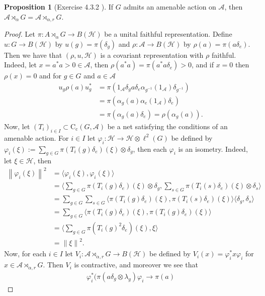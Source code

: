\documentclass[10pt,oneside,openany,final]{memoir}
\theoremstyle{definition}
\newtheorem{proposition}[theorem]{Proposition}
\theoremstyle{Break}
\newcommand{\lv}{\left\lVert}
\newcommand{\rv}{\right\rVert}
\newcommand{\A}{\mathcal{A}}
\newcommand{\cc}{\text{C}_{\text{c}}}
\renewcommand{\H}{\mathcal{H}}
\begin{document}
\begin{proposition}[Exercise 4.3.2 \text{[BO]}]
If $G$ admits an amenable action on $\A$, then $\A \rtimes_{\alpha}G=\A \rtimes_{\alpha,r}G$.
\begin{proof}
Let $\pi \colon A \rtimes_{\alpha} G \to B(\H)$ be a unital faithful representation. Define $u\colon G \to B(\H)$ by $u(g)=\pi(\delta_{g})$ and $\rho \colon \A \to B(\H)$ by $\rho(a)=\pi(a \delta_{e})$. Then we have that $(\rho,u,\H)$ is a covariant representation with $\rho$ faithful. Indeed, let $x=a^*a>0 \in \A$, then $\rho(a^*a)=\pi(a^*a \delta_{e})>0$, and if $x=0$ then $\rho(x)=0$ and for $g \in G$ and $a \in \A$ 
\begin{align*}
u_{g} \rho(a) u_{g}^*&=\pi(1_{\A} \delta_{g} a \delta_{e} \alpha_{g^{-1}}(1_{\A})\delta_{g^{-1}})\\
&= \pi(\alpha_{g}(a) \alpha_{e}(1_{\A}) \delta_{e})\\
&=\pi(\alpha_{g}(a) \delta_{e})=\rho(\alpha_{g}(a)). 
\end{align*}
Now, let $(T_{i})_{i \in I} \subset \cc(G,\A)$ be a net satisfying the conditions of an amenable action. For $i \in I$ let $\varphi_{i} \colon \H \to \H \otimes \ell^2(G)$ be defined by $\varphi_{i}(\xi):=\sum_{g \in G} \pi(T_{i}(g)\delta_{e})(\xi) \otimes \delta_{g}$, then each $\varphi_{i}$ is an isometry. Indeed, let $\xi \in \H$, then 
\begin{align*}
\lv \varphi_{i}(\xi)\rv^2&= \langle \varphi_{i}(\xi), \varphi_{i}(\xi)\rangle\\
&=\langle \sum_{g \in G} \pi(T_{i}(g)\delta_{e})(\xi) \otimes \delta_{g}, \sum_{s \in G} \pi(T_{i}(s)\delta_{e})(\xi) \otimes \delta_{s} \rangle\\
&=\sum_{g \in G} \sum_{s \in G} \langle \pi(T_{i}(g)\delta_{e})(\xi), \pi(T_{i}(s)\delta_{e})(\xi)\rangle \langle \delta_{g}, \delta_{s}\rangle\\
&=\sum_{g \in G} \langle \pi(T_{i}(g)\delta_{e}) (\xi), \pi(T_{i}(g)\delta_{e}) (\xi)\rangle\\
&=\langle \sum_{g \in G} \pi(T_{i}(g)^2 \delta_{e})(\xi),\xi\rangle\\
&=\lv \xi  \rv^2.
\end{align*} 
Now, for each $i \in I$ let $V_{i} \colon \A \rtimes_{\alpha,r} G \to B(\H)$ be defined by $V_{i}(x)=\varphi_{i}^* x \varphi_{i}$ for $x \in \A \rtimes_{\alpha,r}G$. Then $V_{i}$ is contractive, and moreover we see that 
\begin{align*}
\varphi_{i}^*(\pi(a \delta_{g} \otimes \lambda_{g}) \varphi_{i}\to \pi(a)

\end{align*}
\end{proof}
\end{proposition}
\end{document}
